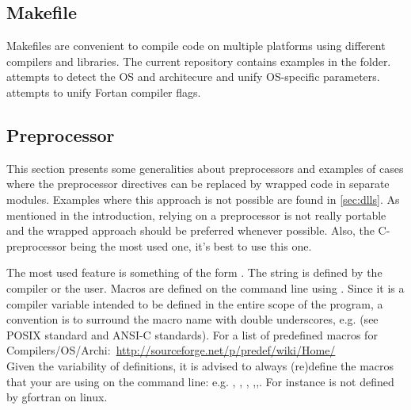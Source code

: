 \documentclass{article}
\begin{document}
\subsection{Makefile}
\label{sec:makefile}
Makefiles are convenient to compile code on multiple platforms using different compilers and libraries. The current repository contains examples in the \cmd{_\mkf} folder.
 attempts to detect the OS and architecure and unify OS-specific parameters.
 attempts to unify Fortan compiler flags.

\subsection{Preprocessor}
\label{sec:preprocessor}
This section presents some generalities about preprocessors and examples of cases where the preprocessor directives can be replaced by wrapped code in separate modules.
Examples where this approach is not possible are found in \autoref{sec:dlls}.
As mentioned in the introduction, relying on a preprocessor is not really portable and the wrapped approach should be preferred whenever possible. Also, the C-preprocessor being the most used one, it's best to use this one.

The most used feature is something of the form .
The string  is defined by the compiler or the user.
Macros are defined on the command line using . Since it is a compiler variable intended to be defined in the entire scope of the program, a convention is to surround the macro name with double underscores, e.g.  (see POSIX standard and ANSI-C standards).
For a list of predefined macros for Compilers/OS/Archi:~\url{http://sourceforge.net/p/predef/wiki/Home/}\\
Given the variability of definitions, it is advised to always (re)define the macros that your are using on the command line: e.g. , , , ,,. For instance  is not defined by gfortran on linux.
\end{document}
